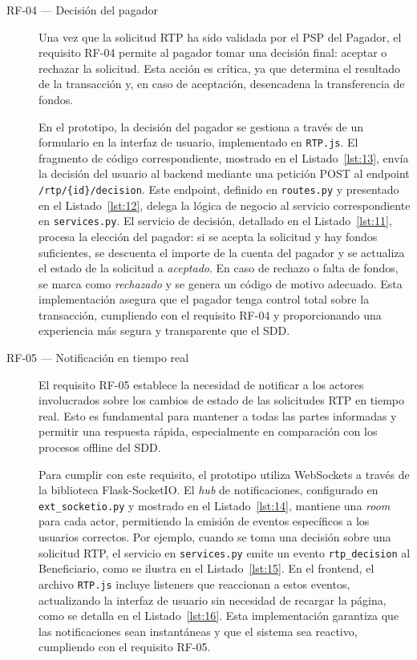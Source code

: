 \begin{description}
\item[RF-04 — Decisión del pagador]  
Una vez que la solicitud RTP ha sido validada por el PSP del Pagador, el requisito RF-04 permite al pagador tomar una decisión final: aceptar o rechazar la solicitud. Esta acción es crítica, ya que determina el resultado de la transacción y, en caso de aceptación, desencadena la transferencia de fondos.

En el prototipo, la decisión del pagador se gestiona a través de un formulario en la interfaz de usuario, implementado en \texttt{RTP.js}. El fragmento de código correspondiente, mostrado en el Listado~\ref{lst:13}, envía la decisión del usuario al backend mediante una petición POST al endpoint \texttt{/rtp/\{id\}/decision}. Este endpoint, definido en \texttt{routes.py} y presentado en el Listado~\ref{lst:12}, delega la lógica de negocio al servicio correspondiente en \texttt{services.py}. El servicio de decisión, detallado en el Listado~\ref{lst:11}, procesa la elección del pagador: si se acepta la solicitud y hay fondos suficientes, se descuenta el importe de la cuenta del pagador y se actualiza el estado de la solicitud a \textit{aceptado}. En caso de rechazo o falta de fondos, se marca como \textit{rechazado} y se genera un código de motivo adecuado. Esta implementación asegura que el pagador tenga control total sobre la transacción, cumpliendo con el requisito RF-04 y proporcionando una experiencia más segura y transparente que el SDD.

\item[RF-05 — Notificación en tiempo real]  
El requisito RF-05 establece la necesidad de notificar a los actores involucrados sobre los cambios de estado de las solicitudes RTP en tiempo real. Esto es fundamental para mantener a todas las partes informadas y permitir una respuesta rápida, especialmente en comparación con los procesos offline del SDD.

Para cumplir con este requisito, el prototipo utiliza WebSockets a través de la biblioteca Flask-SocketIO. El \emph{hub} de notificaciones, configurado en \texttt{ext\_socketio.py} y mostrado en el Listado~\ref{lst:14}, mantiene una \textit{room} para cada actor, permitiendo la emisión de eventos específicos a los usuarios correctos. Por ejemplo, cuando se toma una decisión sobre una solicitud RTP, el servicio en \texttt{services.py} emite un evento \texttt{rtp\_decision} al Beneficiario, como se ilustra en el Listado~\ref{lst:15}. En el frontend, el archivo \texttt{RTP.js} incluye listeners que reaccionan a estos eventos, actualizando la interfaz de usuario sin necesidad de recargar la página, como se detalla en el Listado~\ref{lst:16}. Esta implementación garantiza que las notificaciones sean instantáneas y que el sistema sea reactivo, cumpliendo con el requisito RF-05.


\end{description}

